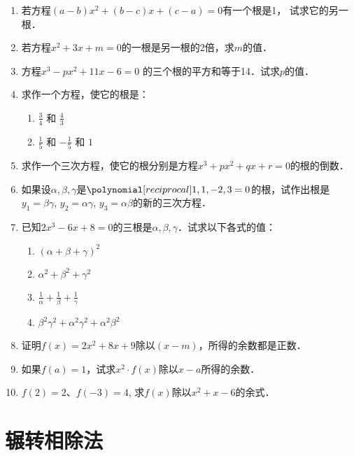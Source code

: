 \begin{enumerate}
\item 若方程$(a-b)x^2+(b-c)x+(c-a)=0$有一个根是1，
试求它的另一根．
\item 若方程$x^2+3x+m=0$的一根是另一根的2倍，求$m$的值．
\item 方程$x^3-px^2+11x-6=0$ 的三个根的平方和等于14．试求$p$的值．
\item 求作一个方程，使它的根是：
\begin{multicols}{2}
    \begin{enumerate}
    \item $\frac{3}{4}$ 和 $\frac{4}{3}$
    \item $\frac{1}{5}$ 和 $-\frac{1}{5}$ 和 $1$
\end{enumerate}
\end{multicols}

\item 求作一个三次方程，使它的根分别是方程$x^3+px^2+qx+r=0$的根的倒数．

\item 如果设$\alpha,\beta,
\gamma$是$\poly{1,1,-2,3}=0$的根，试作出根是
$y_1=\beta\gamma$, $y_2=\alpha\gamma$, $y_3=\alpha\beta$的新的三次方程．

\item 已知$2x^3-6x+8=0$的三根是$\alpha,\beta,
\gamma$．试求以下各式的值：
\begin{multicols}{2}
    \begin{enumerate}
    \item $(\alpha+\beta+\gamma)^2$ 
    \item $\alpha^2+\beta^2+\gamma^2$ 
    \item $\frac{1}{\alpha}+\frac{1}{\beta}+\frac{1}{\gamma}$
    \item $\beta^2\gamma^2+\alpha^2\gamma^2+\alpha^2\beta^2$
\end{enumerate}
\end{multicols}

\item 证明$f(x)=2x^2+8x+9$除以$(x-m)$，所得的余数都是正数．

\item 如果$f(a)=1$，试求$x^2\cdot f(x)$除以$x-a$所得的余数．

\item $f(2)=2$、$f(-3)=4$, 求$f(x)$除以$x^2+x-6$的余式．

\end{enumerate}


\section{辗转相除法}
